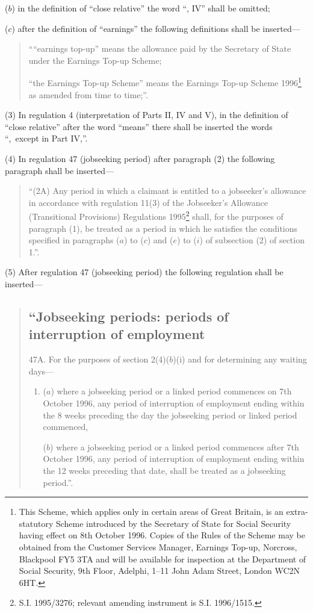 \documentclass[12pt,a4paper]{article}
\begin{document}
\begin{enumerate}
($b$) in the definition of “close relative” the word “, IV” shall be omitted;

($c$) after the definition of “earnings” the following definitions shall be inserted—
\begin{quotation}
““earnings top-up” means the allowance paid by the Secretary of State under the Earnings Top-up Scheme;

“the Earnings Top-up Scheme” means the Earnings Top-up Scheme 1996\footnote{\frenchspacing This Scheme, which applies only in certain areas of Great Britain, is an extra-statutory Scheme introduced by the Secretary of State for Social Security having effect on 8th October 1996. Copies of the Rules of the Scheme may be obtained from the Customer Services Manager, Earnings Top-up, Norcross, Blackpool FY5 3TA and will be available for inspection at the Department of Social Security, 9th Floor, Adelphi, 1--11 John Adam Street, London WC2N 6HT.} as amended from time to time;”.
\end{quotation}
\end{enumerate}

(3) In regulation 4 (interpretation of Parts II, IV and V), in the definition of “close relative” after the word “means” there shall be inserted the words “,~except in Part IV,”.

(4) In regulation 47 (jobseeking period) after paragraph (2) the following paragraph shall be inserted—
\begin{quotation}
“(2A) Any period in which a claimant is entitled to a jobseeker’s allowance in accordance with regulation 11(3) of the Jobseeker’s Allowance (Transitional Provisions) Regulations 1995\footnote{\frenchspacing S.I. 1995/3276; relevant amending instrument is S.I. 1996/1515.} shall, for the purposes of paragraph (1), be treated as a period in which he satisfies the conditions specified in paragraphs ($a$) to ($c$) and ($e$) to ($i$) of subsection (2) of section 1.”.
\end{quotation}

(5) After regulation 47 (jobseeking period) the following regulation shall be inserted—
\begin{quotation}
\subsection*{“Jobseeking periods: periods of interruption of employment}

47A.  For the purposes of section 2(4)($b$)(i) and for determining any waiting days—
\begin{enumerate}\item[]
($a$) where a jobseeking period or a linked period commences on 7th October 1996, any period of interruption of employment ending within the 8 weeks preceding the day the jobseeking period or linked period commenced,

($b$) where a jobseeking period or a linked period commences after 7th October 1996, any period of interruption of employment ending within the 12 weeks preceding that date,
shall be treated as a jobseeking period.”.
\end{enumerate}
\end{quotation}
\end{document}
